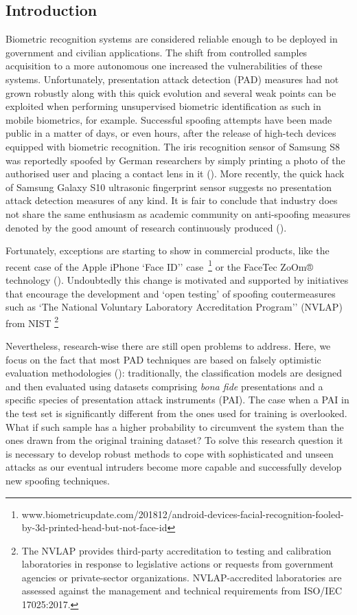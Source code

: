 \subsection{Introduction}
\label{sec:adv_iris_attack_intro}
Biometric recognition systems are considered reliable enough to be deployed in government and civilian applications. The shift from controlled samples acquisition to a more autonomous one increased the vulnerabilities of these systems. Unfortunately, presentation attack detection (PAD) measures had not grown robustly along with this quick evolution and several weak points can be exploited when performing unsupervised biometric identification as such in mobile biometrics, for example. Successful spoofing attempts have been made public in a matter of days, or even hours, after the release of high-tech devices equipped with biometric recognition. The iris recognition sensor of Samsung S8 was reportedly spoofed by German researchers by simply printing a photo of the authorised user and placing a contact lens in it (\citet{cccsamsung2017}). More recently, the quick hack of Samsung Galaxy S10 ultrasonic fingerprint sensor suggests no presentation attack detection measures of any kind. It is fair to conclude that industry does not share the same enthusiasm as academic community on anti-spoofing measures denoted by the good amount of research continuously produced (\citet{raghavendra2015VSIA,czajka2018irisPADreview,Galbally2019,scherhag2019}).

Fortunately, exceptions are starting to show in commercial products, like the recent case of the Apple iPhone `Face ID'' case~\footnote{www.biometricupdate.com/201812/android-devices-facial-recognition-fooled-by-3d-printed-head-but-not-face-id} or the FaceTec ZoOm® technology (\citet{facetec102019}). Undoubtedly this change is motivated and supported by initiatives that encourage the development and `open testing' of spoofing coutermeasures such as `The National Voluntary Laboratory Accreditation Program'' (NVLAP) from NIST \footnote{The NVLAP provides third-party accreditation to testing and calibration laboratories in response to legislative actions or requests from government agencies or private-sector organizations. NVLAP-accredited laboratories are assessed against the management and technical requirements from ISO/IEC 17025:2017.}

Nevertheless, research-wise there are still open problems to address. Here, we focus on the fact that most PAD techniques are based on falsely optimistic evaluation methodologies (\citet{sequeira2016realistic}): traditionally, the classification models are designed and then evaluated using datasets comprising \emph{bona fide} presentations and a specific species of presentation attack instruments (PAI). The case when a PAI in the test set is significantly different from the ones used for training is overlooked. What if such sample has a higher probability to circumvent the system than the ones drawn from the original training dataset? To solve this research question it is necessary to develop robust methods to cope with sophisticated and unseen attacks as our eventual intruders become more capable and successfully develop new spoofing techniques.

